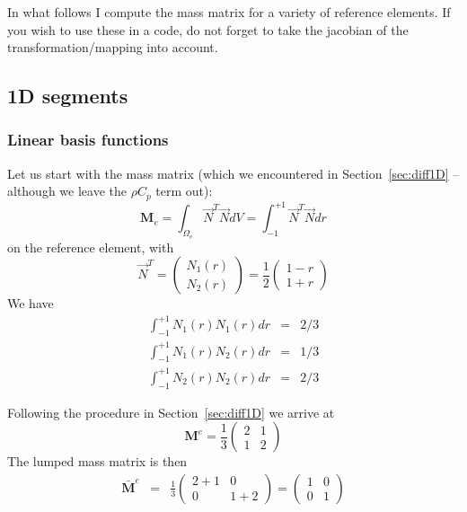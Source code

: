 
In what follows I compute the mass matrix for a variety of reference elements.
If you wish to use these in a code, do not forget to take the jacobian 
of the transformation/mapping into account. 

\subsection{1D segments}

\subsubsection{Linear basis functions}

Let us start with the mass matrix (which we encountered in 
Section~\ref{sec:diff1D} -- although we leave the $\rho C_p$ term out):
\begin{equation}
{\bm M}_e=\int_{\Omega_e} \vec{N}^T \vec{N} dV
= \int_{-1}^{+1} \vec{N}^T \vec{N} dr
\end{equation}
on the reference element, with 
\[
{\vec N}^T = 
\left(
\begin{array}{c}
N_1(r) \\ N_2(r)
\end{array}
\right)
=
\frac{1}{2}
\left(
\begin{array}{c}
1-r \\ 1+r
\end{array}
\right)
\]
We have 
\begin{eqnarray}
\int_{-1}^{+1} N_1(r) N_1(r) dr &=& 2/3 \\ 
\int_{-1}^{+1} N_1(r) N_2(r) dr &=& 1/3 \\
\int_{-1}^{+1} N_2(r) N_2(r) dr &=& 2/3
\end{eqnarray}

Following the procedure in Section~\ref{sec:diff1D} we arrive at
\[
{\bm M}^e= \frac{1}{3} 
\left(
\begin{array}{cc}
2  & 1 \\
1 & 2
\end{array}
\right)
\]
The lumped mass matrix is then
\begin{eqnarray}
\bar{\bm M}^e 
&=&
\frac{1}{3}
\left(
\begin{array}{cc}
2+1  & 0 \\
0 & 1+2
\end{array}
\right)
=
\left(
\begin{array}{cc}
1  & 0 \\
0 & 1
\end{array}
\right)
\end{eqnarray}

